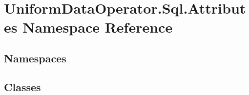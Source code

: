 \hypertarget{namespace_uniform_data_operator_1_1_sql_1_1_attributes}{}\section{Uniform\+Data\+Operator.\+Sql.\+Attributes Namespace Reference}
\label{namespace_uniform_data_operator_1_1_sql_1_1_attributes}
\subsection*{Namespaces}
\begin{DoxyCompactItemize}
\end{DoxyCompactItemize}
\subsection*{Classes}
